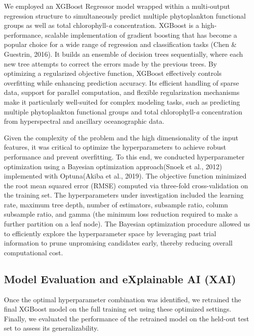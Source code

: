 \documentclass[
]{agujournal2019}
\begin{document}
We employed an XGBoost Regressor model wrapped within a multi-output
regression structure to simultaneously predict multiple phytoplankton
functional groups as well as total chlorophyll-\emph{a} concentration.
XGBoost is a high-performance, scalable implementation of gradient
boosting that has become a popular choice for a wide range of regression
and classification tasks (Chen \& Guestrin, 2016). It builds an ensemble
of decision trees sequentially, where each new tree attempts to correct
the errors made by the previous trees. By optimizing a regularized
objective function, XGBoost effectively controls overfitting while
enhancing prediction accuracy. Its efficient handling of sparse data,
support for parallel computation, and flexible regularization mechanisms
make it particularly well-suited for complex modeling tasks, such as
predicting multiple phytoplankton functional groups and total
chlorophyll-\emph{a} concentration from hyperspectral and ancillary
oceanographic data.

Given the complexity of the problem and the high dimensionality of the
input features, it was critical to optimize the hyperparameters to
achieve robust performance and prevent overfitting. To this end, we
conducted hyperparameter optimization using a Bayesian optimization
approach(Snoek et al., 2012) implemented with Optuna(Akiba et al.,
2019). The objective function minimized the root mean squared error
(RMSE) computed via three-fold cross-validation on the training set. The
hyperparameters under investigation included the learning rate, maximum
tree depth, number of estimators, subsample ratio, column subsample
ratio, and gamma (the minimum loss reduction required to make a further
partition on a leaf node). The Bayesian optimization procedure allowed
us to efficiently explore the hyperparameter space by leveraging past
trial information to prune unpromising candidates early, thereby
reducing overall computational cost.

\subsection{Model Evaluation and eXplainable AI
(XAI)}\label{model-evaluation-and-explainable-ai-xai}

Once the optimal hyperparameter combination was identified, we retrained
the final XGBoost model on the full training set using these optimized
settings. Finally, we evaluated the performance of the retrained model
on the held-out test set to assess its generalizability.
\end{document}
